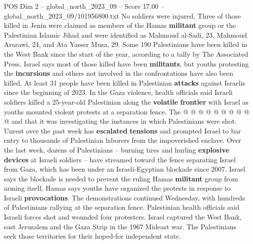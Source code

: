 \begin{textsample}{POS Dim 2 – global\_north\_2023\_09 – Score 17.00 – global\_north\_2023\_09/101956800.txt}
No soldiers were injured.
Three of those killed in Jenin were claimed as members of the Hamas \textbf{militant} group or the Palestinian Islamic Jihad and were identified as Mahmoud al-Sadi, 23, Mahmoud Ararawi, 24, and Ata Yasser Musa, 29.
Some 190 Palestinians have been killed in the West Bank since the start of the year, according to a tally by The Associated Press.
Israel says most of those killed have been \textbf{militants}, but youths protesting the \textbf{incursions} and others not involved in the confrontations have also been killed.
At least 31 people have been killed in Palestinian \textbf{attacks} against Israelis since the beginning of 2023.
In the Gaza violence, health officials said Israeli soldiers killed a 25-year-old Palestinian along the \textbf{volatile} \textbf{frontier} with Israel as youths mounted violent protests at a separation fence.
The @ @ @ @ @ @ @ @ @ @ and that it was investigating the instances in which Palestinians were shot.
Unrest over the past week has \textbf{escalated} \textbf{tensions} and prompted Israel to bar entry to thousands of Palestinian laborers from the impoverished enclave.
Over the last week, dozens of Palestinians -- burning tires and hurling \textbf{explosive} \textbf{devices} at Israeli soldiers -- have streamed toward the fence separating Israel from Gaza, which has been under an Israeli-Egyptian blockade since 2007.
Israel says the blockade is needed to prevent the ruling Hamas \textbf{militant} group from arming itself.
Hamas says youths have organized the protests in response to Israeli \textbf{provocations}.
The demonstrations continued Wednesday, with hundreds of Palestinians rallying at the separation fence.
Palestinian health officials said Israeli forces shot and wounded four protesters.
Israel captured the West Bank, east Jerusalem and the Gaza Strip in the 1967 Mideast war.
The Palestinians seek those territories for their hoped-for independent state.

\end{textsample}
